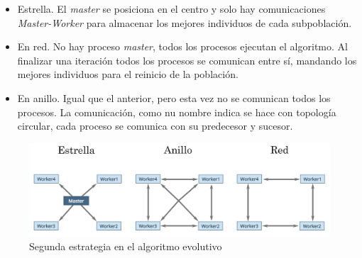 	\begin{itemize}
		\item Estrella. El \textit{master} se posiciona en el centro y solo hay comunicaciones \textit{Master-Worker} para almacenar los mejores individuos de cada subpoblación.
		\item En red. No hay proceso \textit{master}, todos los procesos ejecutan el algoritmo. Al finalizar una iteración todos los procesos se comunican entre sí, mandando los mejores individuos para el reinicio de la población.
		\item En anillo. Igual que el anterior, pero esta vez no se comunican todos los procesos. La comunicación, como nu nombre indica se hace con topología circular, cada proceso se comunica con su predecesor y sucesor.
	\end{itemize}
	
	\begin{figure}[!h]
		\centering
		\includegraphics[width=\textwidth]{images/chapter_3/pev_mpi2}
		\caption{Segunda estrategia en el algoritmo evolutivo}
		\label{fig:pev3_mpi2}
	\end{figure}
	
